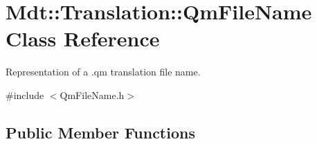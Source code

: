 \hypertarget{class_mdt_1_1_translation_1_1_qm_file_name}{}\section{Mdt\+:\+:Translation\+:\+:Qm\+File\+Name Class Reference}
\label{class_mdt_1_1_translation_1_1_qm_file_name}


Representation of a .qm translation file name.  




{\ttfamily \#include $<$Qm\+File\+Name.\+h$>$}

\subsection*{Public Member Functions}
